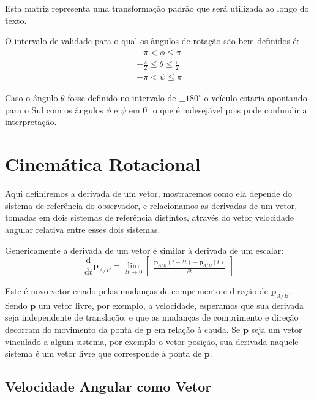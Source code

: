 Esta matriz representa uma transformação padrão que será utilizada ao longo do texto.

O intervalo de validade para o qual os ângulos de rotação são bem definidos é:
\begin{align*}
    -\pi  < \phi \leq \pi \\
    -\frac{\pi}{2} \leq \theta \leq \frac{\pi}{2} \\
    -\pi < \psi \leq \pi
\end{align*}

Caso o ângulo \( \theta \) fosse definido no intervalo de \( \pm 180^{\circ} \) o veículo estaria apontando para o Sul com os ângulos \(\phi\) e \(\psi\) em \( 0^{\circ}\) o que é indesejável pois pode confundir a interpretação.


\section{Cinemática Rotacional}

Aqui definiremos a derivada de um vetor, mostraremos como ela depende do sistema de referência do observador, e relacionamos as derivadas de um vetor, tomadas em dois sistemas de referência distintos, através do vetor velocidade angular relativa entre esses dois sistemas.

Genericamente a derivada de um vetor é similar à derivada de um escalar:
\begin{equation*}
    \frac{\mathrm{d}}{\mathrm{d}t} \mathbf{p}_{A/B} =  \lim_{\delta t \rightarrow 0 } \begin{bmatrix}
        \displaystyle\frac{\mathbf{p}_{A/B} (t + \delta t) - \mathbf{p}_{A/B} (t) }{\delta t}
    \end{bmatrix}
\end{equation*}

Este é novo vetor criado pelas mudanças de comprimento e direção de \(\mathbf{p}_{A/B}\). Sendo \(\mathbf{p}\) um vetor livre, por exemplo, a velocidade, esperamos que sua derivada seja independente de translação, e que as mudanças de comprimento e direção decorram do movimento da ponta de \(\mathbf{p}\) em relação à cauda. Se \(\mathbf{p}\) seja um vetor vinculado a algum sistema, por exemplo o vetor posição, sua derivada naquele sistema é um vetor livre que corresponde à ponta de \(\mathbf{p}\).

\subsection{Velocidade Angular como Vetor}

